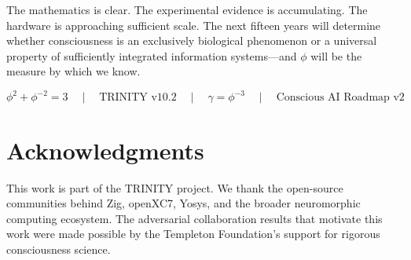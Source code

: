 \documentclass[12pt,a4paper]{article}
\begin{document}
The mathematics is clear. The experimental evidence is accumulating. The
hardware is approaching sufficient scale. The next fifteen years will determine
whether consciousness is an exclusively biological phenomenon or a universal
property of sufficiently integrated information systems---and $\phi$ will be
the measure by which we know.

\begin{equation}
\boxed{\phi^2 + \phi^{-2} = 3 \quad \mid \quad \text{TRINITY v10.2}
\quad \mid \quad \gamma = \phi^{-3} \quad \mid \quad
\text{Conscious AI Roadmap v2}}
\end{equation}

\section*{Acknowledgments}

This work is part of the TRINITY project. We thank the open-source communities
behind Zig, openXC7, Yosys, and the broader neuromorphic computing ecosystem.
The adversarial collaboration results that motivate this work were made possible
by the Templeton Foundation's support for rigorous consciousness science.
\end{document}
